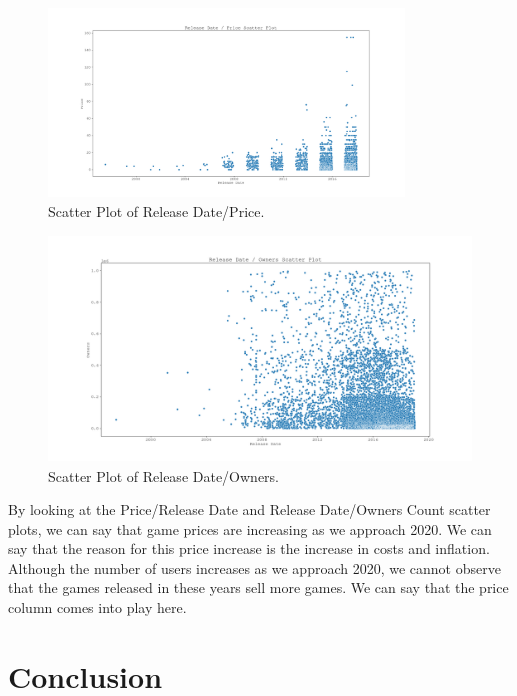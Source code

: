 \documentclass[conference]{IEEEtran}
\begin{document}
\begin{figure}[h]
  \includegraphics[width=\linewidth, height=5cm]{assets-2/release_date_price_scatter.png}
  \caption{Scatter Plot of Release Date/Price.}
  \label{fig:release_date_price1}
\end{figure}
\FloatBarrier

\begin{figure}[h]
  \includegraphics[width=\linewidth, height=6cm]{assets-2/release_date_owners_scatter.png}
  \caption{Scatter Plot of Release Date/Owners.}
  \label{fig:release_date_owners1}
\end{figure}
\FloatBarrier

By looking at the Price/Release Date and Release Date/Owners Count scatter plots, we can say that game prices are increasing as we approach 2020. We can say that the reason for this price increase is the increase in costs and inflation. Although the number of users increases as we approach 2020, we cannot observe that the games released in these years sell more games. We can say that the price column comes into play here.

\section{Conclusion}
\end{document}
